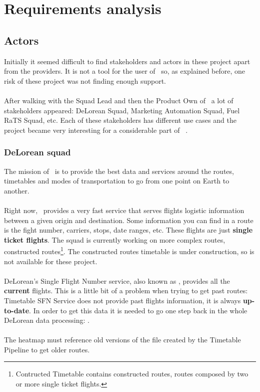 
\chapter{Requirements analysis}

\label{chapter04}

\section{Actors}

Initially it seemed difficult to find stakeholders and actors in these project apart from the providers. It is not a tool for the user of \company\, so, as explained before, one risk of these project was not finding enough support.
\\\\
After walking with the Squad Lead and then the Product Own of \squad\ a lot of stakeholders appeared: DeLorean Squad, Marketing Automation Squad, Fuel RaTS Squad, etc. Each of these stakeholders has different use cases and the project became very interesting for a considerable part of \company\ .

\subsection{DeLorean squad} \label{dlr}

The mission of \squad\ is to provide the best data and services around the routes, timetables and modes of transportation to go from one point on Earth to another.
\\\\
Right now, \squad\ provides a very fast service that serves flights logistic information between a given origin and destination. Some information you can find in a route is the fight number, carriers, stops, date ranges, etc. These flights are just \textbf{single ticket flights}. The squad is currently working on more complex routes, constructed routes\footnote{Contructed Timetable contains constructed routes, routes composed by two or more single ticket flights.}. The constructed routes timetable is under construction, so is not available for these project.
\\\\
DeLorean's Single Flight Number service, also known as , provides all the \textbf{current} flights. This is a little bit of a problem when trying to get past routes: Timetable SFN Service does not provide past flights information, it is always \textbf{up-to-date}. In order to get this data it is needed to go one step back in the whole DeLorean data processing: .
\\\\
The heatmap must reference old versions of the file created by the Timetable Pipeline to get older routes.


